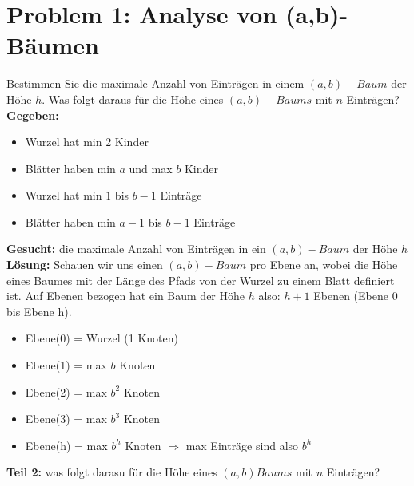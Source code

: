 \section*{{Problem 1: Analyse von (a,b)-Bäumen}}


Bestimmen Sie die maximale Anzahl von Einträgen in einem $(a, b)-Baum$ der Höhe $h$. Was folgt daraus für die Höhe eines $(a, b)-Baums$ mit $n$ Einträgen?\\

\noindent
\textbf{Gegeben:}
\begin{itemize}
	\item Wurzel hat min 2 Kinder
	\item Blätter haben min $a$ und max $b$ Kinder
	\item Wurzel hat min $1$ bis $b-1$ Einträge
	\item Blätter haben min $a-1$ bis $b-1$ Einträge
\end{itemize}
\noindent
\textbf{Gesucht:} die maximale Anzahl von Einträgen in ein $(a,b)-Baum$ der Höhe $h$\\
\noindent
\textbf{Lösung:} Schauen wir uns einen $(a,b)-Baum$ pro Ebene an, wobei die Höhe eines Baumes mit der Länge des Pfads von der Wurzel zu einem Blatt definiert ist. Auf Ebenen bezogen hat ein Baum der Höhe $h$ also: $h+1$ Ebenen (Ebene 0 bis Ebene h).

\begin{itemize}
	\item Ebene(0) = Wurzel (1 Knoten)
	\item Ebene(1) = max $b$ Knoten
	\item Ebene(2) = max $b^2$ Knoten
	\item Ebene(3) = max $b^3$ Knoten
	\item Ebene(h) = max $b^h$ Knoten $\Rightarrow$ max Einträge sind also $b^h$
\end{itemize}
\textbf{Teil 2:} was folgt darasu für die Höhe eines $(a,b)Baums$ mit $n$ Einträgen?

